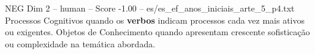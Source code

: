 \begin{textsample}{NEG Dim 2 – human – Score -1.00 – es/es\_ef\_anos\_iniciais\_arte\_5\_p4.txt}  \label{ex:f2_neg_017}
Processos Cognitivos quando os \textbf{verbos} indicam processos cada vez mais ativos ou exigentes.
Objetos de Conhecimento quando apresentam crescente sofisticação ou complexidade na temática abordada.

\end{textsample}
